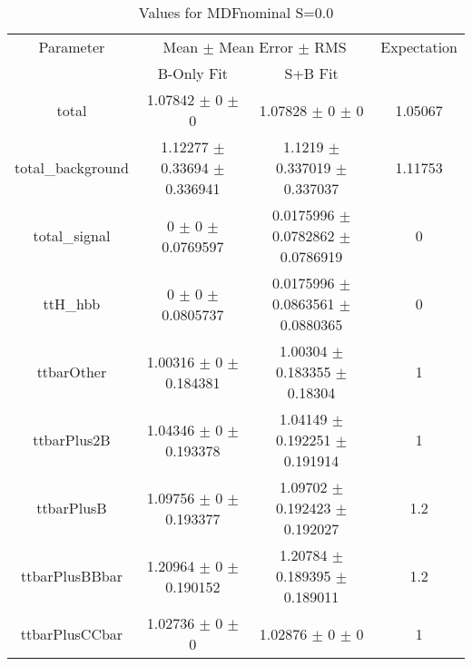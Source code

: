\begin{table}
\centering
\caption{Values for MDFnominal S=0.0}
\begin{tabular}{cccc}
\toprule
Parameter & \multicolumn{2}{c}{Mean $\pm$ Mean Error $\pm$ RMS} & Expectation\\
 & B-Only Fit & S+B Fit & \\
\midrule
total & \num{1.07842} $\pm$ \num{0} $\pm$ \num{0} & \num{1.07828} $\pm$ \num{0} $\pm$ \num{0} & \num{1.05067}\\
total\_background & \num{1.12277} $\pm$ \num{0.33694} $\pm$ \num{0.336941} & \num{1.1219} $\pm$ \num{0.337019} $\pm$ \num{0.337037} & \num{1.11753}\\
total\_signal & \num{0} $\pm$ \num{0} $\pm$ \num{0.0769597} & \num{0.0175996} $\pm$ \num{0.0782862} $\pm$ \num{0.0786919} & \num{0}\\
ttH\_hbb & \num{0} $\pm$ \num{0} $\pm$ \num{0.0805737} & \num{0.0175996} $\pm$ \num{0.0863561} $\pm$ \num{0.0880365} & \num{0}\\
ttbarOther & \num{1.00316} $\pm$ \num{0} $\pm$ \num{0.184381} & \num{1.00304} $\pm$ \num{0.183355} $\pm$ \num{0.18304} & \num{1}\\
ttbarPlus2B & \num{1.04346} $\pm$ \num{0} $\pm$ \num{0.193378} & \num{1.04149} $\pm$ \num{0.192251} $\pm$ \num{0.191914} & \num{1}\\
ttbarPlusB & \num{1.09756} $\pm$ \num{0} $\pm$ \num{0.193377} & \num{1.09702} $\pm$ \num{0.192423} $\pm$ \num{0.192027} & \num{1.2}\\
ttbarPlusBBbar & \num{1.20964} $\pm$ \num{0} $\pm$ \num{0.190152} & \num{1.20784} $\pm$ \num{0.189395} $\pm$ \num{0.189011} & \num{1.2}\\
ttbarPlusCCbar & \num{1.02736} $\pm$ \num{0} $\pm$ \num{0} & \num{1.02876} $\pm$ \num{0} $\pm$ \num{0} & \num{1}\\
\bottomrule
\end{tabular}
\end{table}